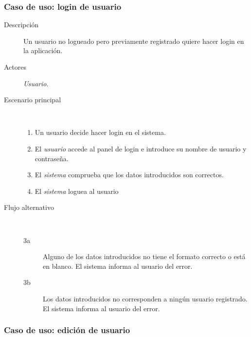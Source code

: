 \subsubsection{Caso de uso: login de usuario}


\begin{description}
\item[Descripción] Un usuario no logueado pero previamente registrado quiere hacer login en la aplicación.
\item[Actores] \textit{Usuario}.
\item[Escenario principal] $\quad$
  \begin{enumerate}
  \item Un usuario decide hacer login en el sistema.
  \item El \textit{usuario} accede al panel de login e introduce su nombre de usuario y contraseña.
  \item El \textit{sistema} comprueba que los datos introducidos son correctos.
  \item El \textit{sistema} loguea al usuario
  \end{enumerate}
\item[Flujo alternativo] $\quad$
  \begin{description}
  \item[3a] Alguno de los datos introducidos no tiene el formato correcto o está
    en blanco. El sistema informa al usuario del error.
  \item[3b] Los datos introducidos no corresponden a ningún usuario
    registrado. El sistema informa al usuario del error.
  \end{description}
\end{description}

\subsubsection{Caso de uso: edición de usuario}

